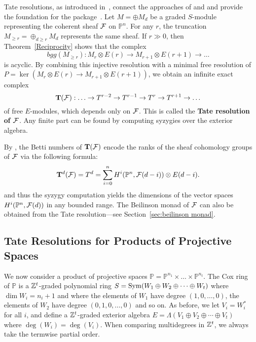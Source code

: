 \documentclass[twoside,12pt, leqno]{amsart}
\def\PP{{\mathbb P}}
\DeclareMathOperator{\rH}{{\rm H}}
\def\bT{{\bf T}}
\def\bU{{\bf U}}
\def\rH{{\rm H}}
\begin{document}
Tate resolutions, as introduced in~\cite{EFS}, connect the approaches of \cite{BGG} and \cite{beilinson} and provide the foundation for the package~\cite{M2BGG}.
Let $M=\oplus M_d$ be a graded $S$-module representing the coherent sheaf ${\mathcal F}$ on $\PP^n$. For any $r$, the truncation $M_{\ge r} = \oplus_{d \ge r}M_d$ represents the same sheaf.  If $r\gg 0$, then Theorem~\ref{Reciprocity} shows that the  complex
$$
bgg(M_{\ge r}) : M_r\otimes E(r) \to M_{r+1}\otimes E(r+1) \to \ldots
$$ 
is acyclic. By combining this injective resolution with a minimal free resolution of $P=\ker(M_r\otimes E(r) \to M_{r+1}\otimes E(r+1))$, we obtain an infinite exact complex
$$
\bT(\sF):   \ldots \to T^{r-2} \to T^{r-1} \to T^r \to T^{r+1} \to \ldots
$$
of free $E$-modules, which depends only on ${\mathcal F}$.  This is called the {\bf Tate resolution of ${\mathcal F}$}. Any finite part can be found by computing syzygies over the exterior algebra.

By \cite[Theorem 4.1] {EFS}, the Betti numbers of $\bT(\sF)$ encode the ranks of the sheaf cohomology groups of ${\mathcal F}$ via the following formula:
$$
\bT^d(\sF) =T^d= \sum_{i=0}^n H^i(\PP^n,\sF(d-i)) \otimes E(d-i).
$$
and thus the syzygy computation yields the dimensions of the vector spaces $H^i(\PP^n,\sF(d))$ in any bounded range. The Beilinson monad of ${\mathcal F}$ can also be obtained from the Tate resolution---see Section~\ref{sec:beilinson monad}.

% 
% 

\subsection{Tate Resolutions for Products of Projective Spaces}\label{subsec:products}
We now consider a product of projective spaces $\PP = \PP^{n_1}\times \ldots \times \PP^{n_{t}}$.  The Cox ring of $\PP$ is a ${\mathbb Z}^{t}$-graded polynomial ring $S=\operatorname{Sym} (W_1\oplus W_2 \oplus \cdots \oplus W_t)$ where $\dim W_i=n_i+1$ and where the elements of $W_1$ have degree $(1,0,\dots,0)$, the elements of $W_2$ have degree $(0,1,0,\dots,0)$ and so on.  As before, we let $V_i=W_i^*$ for all $i$, and define a ${\mathbb Z}^{t}$-graded exterior algebra $E=\Lambda (V_1\oplus V_2\oplus \cdots \oplus V_t)$ where $\deg(W_i)=\deg(V_i)$.  When comparing multidegrees in ${\mathbb Z}^t$, we always take the termwise partial order.  
\end{document}
